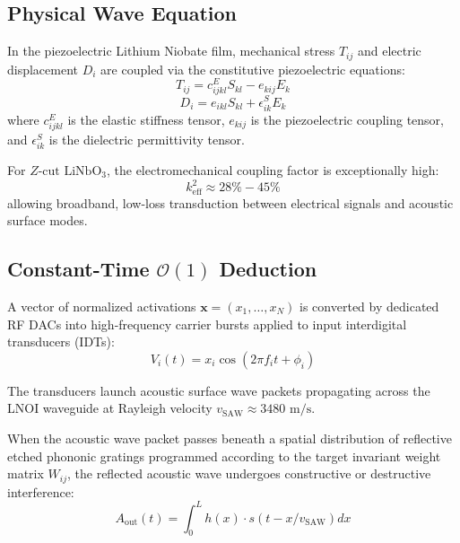\documentclass[10pt,twocolumn]{article}
\begin{document}
\subsection{Physical Wave Equation}

In the piezoelectric Lithium Niobate film, mechanical stress $T_{ij}$ and electric displacement $D_i$ are coupled via the constitutive piezoelectric equations:
\begin{equation}
  T_{ij} = c_{ijkl}^E S_{kl} - e_{kij} E_k
\end{equation}
\begin{equation}
  D_i = e_{ikl} S_{kl} + \epsilon_{ik}^S E_k
\end{equation}
where $c_{ijkl}^E$ is the elastic stiffness tensor, $e_{kij}$ is the piezoelectric coupling tensor, and $\epsilon_{ik}^S$ is the dielectric permittivity tensor.

For $Z\text{-cut } \text{LiNbO}_3$, the electromechanical coupling factor is exceptionally high:
\begin{equation}
  k_{\text{eff}}^2 \approx 28\% - 45\%
\end{equation}
allowing broadband, low-loss transduction between electrical signals and acoustic surface modes.


\subsection{Constant-Time $\mathcal{O}(1)$ Deduction}

A vector of normalized activations $\mathbf{x} = (x_1, \dots, x_N)$ is converted by dedicated RF DACs into high-frequency carrier bursts applied to input interdigital transducers (IDTs):
\begin{equation}
  V_i(t) = x_i \cos(2\pi f_i t + \phi_i)
\end{equation}

The transducers launch acoustic surface wave packets propagating across the LNOI waveguide at Rayleigh velocity $v_{\text{SAW}} \approx 3480\text{ m/s}$. 

When the acoustic wave packet passes beneath a spatial distribution of reflective etched phononic gratings programmed according to the target invariant weight matrix $W_{ij}$, the reflected acoustic wave undergoes constructive or destructive interference:
\begin{equation}
  A_{\text{out}}(t) = \int_0^L h(x) \cdot s(t - x/v_{\text{SAW}}) dx
\end{equation}
\end{document}

